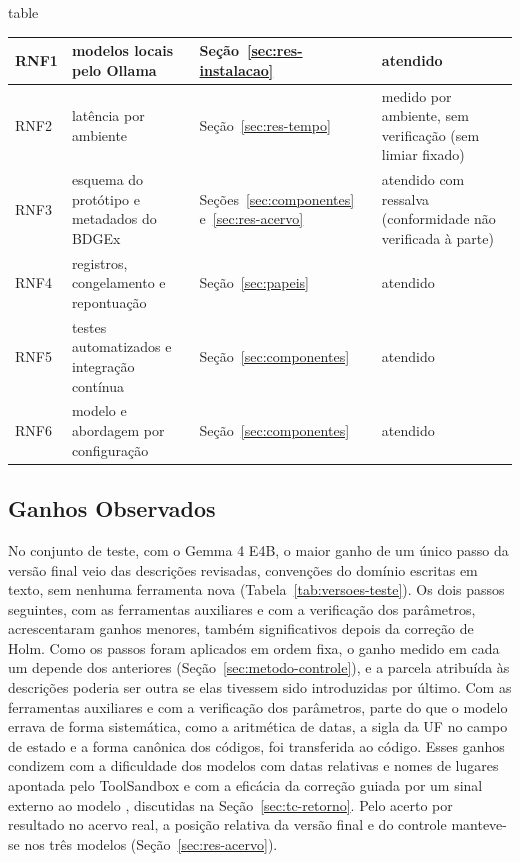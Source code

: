\begin{fixo}{table}
\begin{tabular}{|>{\raggedright\arraybackslash}p{1.1cm}|>{\raggedright\arraybackslash}p{5.9cm}|>{\raggedright\arraybackslash}p{3.4cm}|>{\raggedright\arraybackslash}p{3.8cm}|}
RNF1 & modelos locais pelo Ollama & Seção~\ref{sec:res-instalacao} & atendido \\ \hline
RNF2 & latência por ambiente & Seção~\ref{sec:res-tempo} & medido por ambiente, sem verificação (sem limiar fixado) \\ \hline
RNF3 & esquema do protótipo e metadados do BDGEx & Seções~\ref{sec:componentes} e~\ref{sec:res-acervo} & atendido com ressalva (conformidade não verificada à parte) \\ \hline
RNF4 & registros, congelamento e repontuação & Seção~\ref{sec:papeis} & atendido \\ \hline
RNF5 & testes automatizados e integração contínua & Seção~\ref{sec:componentes} & atendido \\ \hline
RNF6 & modelo e abordagem por configuração & Seção~\ref{sec:componentes} & atendido \\ \hline
\end{tabular}
\end{fixo}

\subsection{Ganhos Observados}
\label{sec:ganhos}

No conjunto de teste, com o Gemma 4 E4B, o maior ganho de um único passo da versão final veio das descrições revisadas, convenções do domínio escritas em texto, sem nenhuma ferramenta nova (Tabela~\ref{tab:versoes-teste}). Os dois passos seguintes, com as ferramentas auxiliares e com a verificação dos parâmetros, acrescentaram ganhos menores, também significativos depois da correção de Holm. Como os passos foram aplicados em ordem fixa, o ganho medido em cada um depende dos anteriores (Seção~\ref{sec:metodo-controle}), e a parcela atribuída às descrições poderia ser outra se elas tivessem sido introduzidas por último. Com as ferramentas auxiliares e com a verificação dos parâmetros, parte do que o modelo errava de forma sistemática, como a aritmética de datas, a sigla da UF no campo de estado e a forma canônica dos códigos, foi transferida ao código. Esses ganhos condizem com a dificuldade dos modelos com datas relativas e nomes de lugares apontada pelo ToolSandbox \cite{lu2025toolsandbox} e com a eficácia da correção guiada por um sinal externo ao modelo \cite{gou2024critic, huang2024cannot}, discutidas na Seção~\ref{sec:tc-retorno}. Pelo acerto por resultado no acervo real, a posição relativa da versão final e do controle manteve-se nos três modelos (Seção~\ref{sec:res-acervo}).

